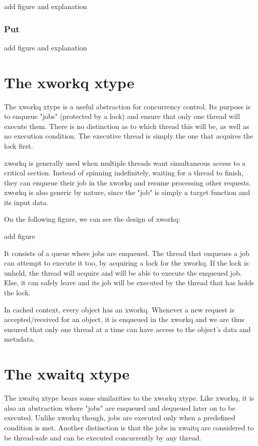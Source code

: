 \fixme add figure and explanation

\subsubsection{Put}

\fixme add figure and explanation

\section{The xworkq xtype}\label{sec:xworkq-design}

The xworkq xtype is a useful abstraction for concurrency control. Its purpose 
is to enqueue "jobs" (protected by a lock) and ensure that only one thread will 
execute them. There is no distinction as to which thread this will be, as well 
as no execution condition. The executive thread is simply the one that acquires 
the lock first.

xworkq is generally used when multiple threads want simultaneous access to a 
critical section. Instead of spinning indefinitely, waiting for a thread to 
finish, they can enqueue their job in the xworkq and resume processing other 
requests. xworkq is also generic by nature, since the "job" is simply a target 
function and its input data.

On the following figure, we can see the design of xworkq:

\fixme add figure

It consists of a queue where jobs are enqueued.  The thread that enqueues a job 
can attempt to execute it too, by acquiring a lock for the xworkq. If the lock 
is unheld, the thread will acquire and will be able to execute the enqueued 
job. Else, it can safely leave and its job will be executed by the thread that 
has holds the lock.

In cached context, every object has an xworkq. Whenever a new request is 
accepted/received for an object, it is enqueued in the xworkq and we are thus 
ensured that only one thread at a time can have access to the object's data and 
metadata.

\section{The xwaitq xtype}\label{sec:xwaitq-design}

The xwaitq xtype bears some similarities to the xworkq xtype. Like xworkq, it 
is also an abstraction where "jobs" are enqueued and dequeued later on to be 
executed. Unlike xworkq though, jobs are executed only when a predefined 
condition is met. Another distinction is that the jobs in xwaitq are considered 
to be thread-safe and can be executed concurrently by any thread.  

